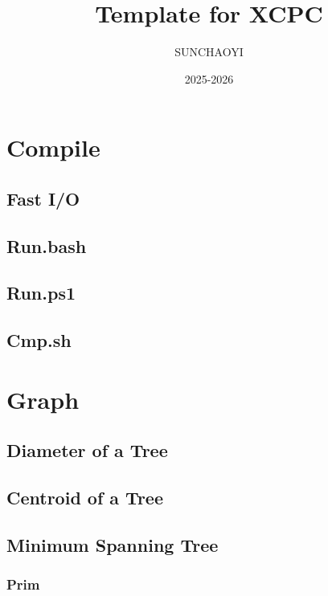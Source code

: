 \documentclass[a4paper]{article}
\title{Template for XCPC}
\author{SUNCHAOYI}
\date{2025-2026}
\begin{document}
\maketitle

\tableofcontents

\pagebreak

\section{Compile}

\subsection{Fast I/O}


\subsection{Run.bash}


\subsection{Run.ps1}


\subsection{Cmp.sh}


\pagebreak

\section{Graph}

\subsection{Diameter of a Tree}


\subsection{Centroid of a Tree}


\subsection{Minimum Spanning Tree}

\subsubsection{Prim}

\end{document}
